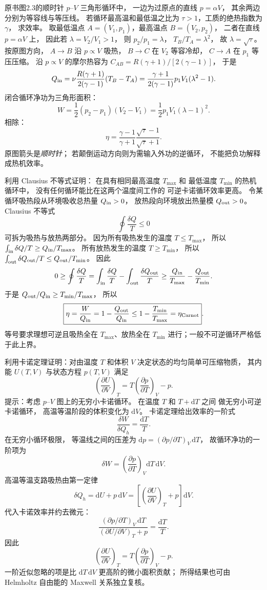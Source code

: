 原书图2.3的顺时针 $p$–$V$ 三角形循环中，
一边为过原点的直线 $p=\alpha V$，
其余两边分别为等容线与等压线。
若循环最高温和最低温之比为
$\tau>1$，工质的绝热指数为 $\gamma$，
求效率。
\exsolution
取最低温点
$A=(V_1,p_1)$，最高温点
$B=(V_2,p_2)$，
二者在直线 $p=\alpha V$ 上，
因此若 $\lambda=V_2/V_1>1$，
则 $p_2/p_1=\lambda$，
$T_B/T_A=\lambda^2$，
故 $\lambda=\sqrt\tau$。
按原图方向，
$A\to B$ 沿 $p\propto V$ 吸热，
$B\to C$ 在 $V_2$ 等容冷却，
$C\to A$ 在 $p_1$ 等压压缩。
沿 $p\propto V$ 的摩尔热容为
$C_{AB}=R(\gamma+1)/[2(\gamma-1)]$，
于是
\[
Q_{\rm in}
=\nu\frac{R(\gamma+1)}{2(\gamma-1)}
(T_B-T_A)
=\frac{\gamma+1}{2(\gamma-1)}
p_1V_1(\lambda^2-1).
\]
闭合循环净功为三角形面积：
\[
W=\frac12(p_2-p_1)(V_2-V_1)
=\frac12p_1V_1(\lambda-1)^2.
\]
相除：
\[
\boxed{\eta=
\frac{\gamma-1}{\gamma+1}
\frac{\sqrt\tau-1}{\sqrt\tau+1}}.
\]
\excheck 原图箭头是\emph{顺时针}；
若颠倒运动方向则为需输入外功的逆循环，
不能把负功解释成热机效率。

利用 Clausius 不等式证明：
在具有相同最高温度 $T_{\max}$ 和
最低温度 $T_{\min}$ 的热机循环中，
没有任何循环能比在这两个温度间工作的
可逆卡诺循环效率更高。
\exsolution
令某循环吸热段从环境吸收总热量 $Q_{\rm in}>0$，
放热段向环境放出热量模 $Q_{\rm out}>0$。
Clausius 不等式
\[
\oint\frac{\delta Q}{T}\le0
\]
可拆为吸热与放热两部分。
因为所有吸热发生的温度
$T\le T_{\max}$，
所以
$\int_{\rm in}\delta Q/T\ge Q_{\rm in}/T_{\max}$。
所有放热发生的温度
$T\ge T_{\min}$，
所以
$\int_{\rm out}\delta Q_{\rm out}/T
\le Q_{\rm out}/T_{\min}$。
因此
\[
0\ge
\oint\frac{\delta Q}{T}
=\int_{\rm in}\frac{\delta Q}{T}
-\int_{\rm out}\frac{\delta Q_{\rm out}}T
\ge\frac{Q_{\rm in}}{T_{\max}}
-\frac{Q_{\rm out}}{T_{\min}}.
\]
于是
$Q_{\rm out}/Q_{\rm in}\ge T_{\min}/T_{\max}$，
所以
\[
\boxed{\eta=\frac{W}{Q_{\rm in}}
=1-\frac{Q_{\rm out}}{Q_{\rm in}}
\le1-\frac{T_{\min}}{T_{\max}}
=\eta_{\rm Carnot}}.
\]
\excheck 等号要求理想可逆且吸热全在
$T_{\max}$、放热全在 $T_{\min}$
进行；一般不可逆循环严格低于此上界。

利用卡诺定理证明：对由温度 $T$ 和体积 $V$
决定状态的均匀简单可压缩物质，
其内能 $U(T,V)$ 与状态方程 $p(T,V)$ 满足
\[
\left(\frac{\partial U}{\partial V}\right)_T
=T\left(\frac{\partial p}{\partial T}\right)_V-p.
\]
提示：考虑 $p$–$V$ 图上的无穷小卡诺循环。
\exsolution
在温度 $T$ 和 $T+\mathrm dT$ 之间
做无穷小可逆卡诺循环，
高温等温阶段的体积变化为 $\mathrm dV$。
卡诺定理给出效率的一阶式
\[
\frac{\delta W}{\delta Q_h}=\frac{\mathrm dT}{T}.
\]
在无穷小循环极限，
等温线之间的压差为
$\mathrm dp=(\partial p/\partial T)_V\,\mathrm dT$，
故循环净功的一阶项为
\[
\delta W=\left(\frac{\partial p}{\partial T}\right)_V
\mathrm dT\,\mathrm dV.
\]
高温等温支路吸热由第一定律
\[
\delta Q_h=\mathrm dU+p\,\mathrm dV
=\left[\left(\frac{\partial U}{\partial V}\right)_T+p\right]
\mathrm dV.
\]
代入卡诺效率并约去微元：
\[
\frac{(\partial p/\partial T)_V\,\mathrm dT}
{(\partial U/\partial V)_T+p}
=\frac{\mathrm dT}{T}.
\]
因此
\[
\boxed{\left(\frac{\partial U}{\partial V}\right)_T
=T\left(\frac{\partial p}{\partial T}\right)_V-p}.
\]
\excheck 一阶近似忽略的项是比
$\mathrm dT\,\mathrm dV$ 更高阶的微小面积贡献；
所得结果也可由 Helmholtz 自由能的
Maxwell 关系独立复核。
